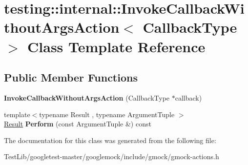 \hypertarget{classtesting_1_1internal_1_1InvokeCallbackWithoutArgsAction}{}\section{testing\+:\+:internal\+:\+:Invoke\+Callback\+Without\+Args\+Action$<$ Callback\+Type $>$ Class Template Reference}
\label{classtesting_1_1internal_1_1InvokeCallbackWithoutArgsAction}
\subsection*{Public Member Functions}
\begin{DoxyCompactItemize}
\item 
\mbox{\label{classtesting_1_1internal_1_1InvokeCallbackWithoutArgsAction_a333d0b92596759753cf78dc98ee7e270}} 
{\bfseries Invoke\+Callback\+Without\+Args\+Action} (Callback\+Type $\ast$callback)
\item 
\mbox{\label{classtesting_1_1internal_1_1InvokeCallbackWithoutArgsAction_ac43b186c6daa5f21c8377678c6a9d4ba}} 
{\footnotesize template$<$typename Result , typename Argument\+Tuple $>$ }\\\hyperlink{classResult}{Result} {\bfseries Perform} (const Argument\+Tuple \&) const
\end{DoxyCompactItemize}


The documentation for this class was generated from the following file\+:\begin{DoxyCompactItemize}
\item 
Test\+Lib/googletest-\/master/googlemock/include/gmock/gmock-\/actions.\+h\end{DoxyCompactItemize}
